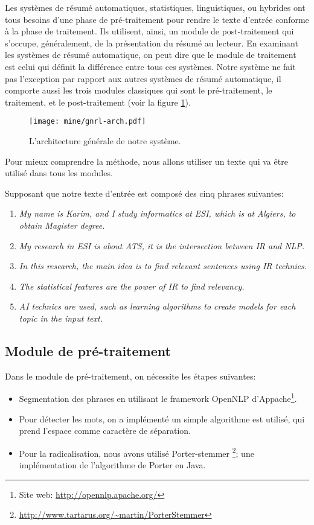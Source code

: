 \documentclass[a4paper,12pt,oneside]{../use/ESIthesis}
\begin{document}
Les systèmes de résumé automatiques, statistiques, linguistiques, ou hybrides ont tous besoins d'une phase de pré-traitement pour rendre le texte d'entrée conforme à la phase de traitement. 
Ils utilisent, ainsi, un module de post-traitement qui s'occupe, généralement, de la présentation du résumé au lecteur. 
En examinant les systèmes de résumé automatique, on peut dire que le module de traitement est celui qui définit la différence entre tous ces systèmes. 
Notre système ne fait pas l'exception par rapport aux autres systèmes de résumé automatique, il comporte aussi les trois modules classiques qui sont le pré-traitement, le traitement, et le post-traitement (voir la figure \ref{fig:gnrl-arch}). 
%
\begin{figure}[ht]
\begin{center}
\texttt{[image: mine/gnrl-arch.pdf]}
\caption{L'architecture générale de notre système.}
\label{fig:gnrl-arch}
\end{center}
\end{figure}

Pour mieux comprendre la méthode, nous allons utiliser un texte qui va être utilisé dans tous les modules. 

\begin{kexp}
Supposant que notre texte d'entrée est composé des cinq phrases suivantes:
\begin{enumerate}
\item \textit{My name is Karim, and I study informatics at ESI, which is at Algiers, to obtain Magister degree.}
\item \textit{My research in ESI is about ATS, it is the intersection between IR and NLP.}
\item \textit{In this research, the main idea is to find relevant sentences using IR technics.}
\item \textit{The statistical features are the power of IR to find relevancy.}
\item \textit{AI technics are used, such as learning algorithms to create models for each topic in the input text.}
\end{enumerate}
\end{kexp}

\subsection{Module de pré-traitement}

Dans le module de pré-traitement, on nécessite les étapes suivantes:
\begin{itemize}
\item Segmentation des phrases en utilisant le framework OpenNLP d'Appache\footnote{Site web: \url{http://opennlp.apache.org/}}. 
\item Pour détecter les mots, on a implémenté un simple algorithme est utilisé, qui prend l'espace comme caractère de séparation. 
\item Pour la radicalisation, nous avons utilisé Porter-stemmer \footnote{\url{http://www.tartarus.org/~martin/PorterStemmer}}; une implémentation de l'algorithme de Porter \cite{97-porter} en Java.
\end{itemize}
\end{document}
